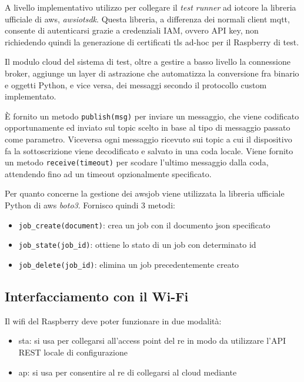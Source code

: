 \documentclass[12pt,a4paper,twoside,titlepage]{book}
\begin{document}
A livello implementativo utilizzo per collegare il \textit{test runner} ad \Gls{iotcore}
la libreria ufficiale di \acrshort{aws}, \textit{awsiotsdk}. Questa libreria, a differenza dei
normali client \Gls{mqtt}, consente di autenticarsi grazie a credenziali IAM, ovvero API key, non
richiedendo quindi la generazione di certificati \acrshort{tls} ad-hoc per il Raspberry di test.

Il modulo cloud del sistema di test, oltre a gestire a basso livello la connessione
\gls{broker}, aggiunge un layer di astrazione che automatizza la conversione fra
binario e oggetti Python, e vice versa, dei messaggi secondo il protocollo custom
implementato.

È fornito un metodo \texttt{publish(msg)} per inviare un messaggio, che viene codificato opportunamente ed
inviato sul \gls{topic} scelto in base al tipo di messaggio passato come parametro. 
Viceversa ogni messaggio ricevuto sui \gls{topic} a cui il dispositivo fa la
sottoscrizione viene decodificato e salvato in una coda locale. Viene fornito un metodo \texttt{receive(timeout)}
per scodare l'ultimo messaggio dalla coda, attendendo fino ad un timeout opzionalmente specificato.

Per quanto concerne la gestione dei \Gls{awsjob} viene utilizzata la libreria ufficiale Python di \acrshort{aws}
\textit{boto3}. Fornisco quindi 3 metodi:
\begin{itemize}
    \item \texttt{job\_create(document)}: crea un job con il documento \acrshort{json} specificato
    \item \texttt{job\_state(job\_id)}: ottiene lo stato di un job con determinato id
    \item \texttt{job\_delete(job\_id)}: elimina un job precedentemente creato
\end{itemize}

\subsection{Interfacciamento con il Wi-Fi}

Il \Gls{wifi} del Raspberry deve poter funzionare in due modalità:
\begin{itemize}
    \item \acrfull{sta}: si usa per collegarsi all'access point del \acrshort{re} in modo da 
        utilizzare l'API REST locale di configurazione
    \item \acrfull{ap}: si usa per consentire al \acrshort{re} di collegarsi al cloud mediante
\end{itemize}
\end{document}
